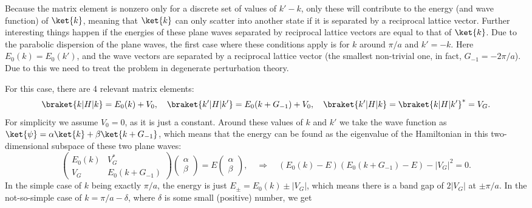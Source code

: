 \documentclass[main.tex]{subfiles}
\begin{document}
	Because the matrix element is nonzero only for a discrete set of values of $ k'-k $, only these will contribute to the energy (and wave function) of $ \ket{k} $, meaning that $ \ket{k} $ can only scatter into another state if it is separated by a reciprocal lattice vector. Further interesting things happen if the energies of these plane waves separated by reciprocal lattice vectors are equal to that of $ \ket{k} $. Due to the parabolic dispersion of the plane waves, the first case where these conditions apply is for $ k $ around $ \pi/a $ and $ k'=-k$. Here $ E_0(k) = E_0(k') $, and the wave vectors are separated by a reciprocal lattice vector (the smallest non-trivial one, in fact, $ G_{-1}=-2\pi/a $). Due to this we need to treat the problem in degenerate perturbation theory.
	
	For this case, there are 4 relevant matrix elements:
	\begin{align}
		\braket{k|H|k} = E_0(k) + V_0, \quad \braket{k'|H|k'} = E_0(k+G_{-1}) + V_0, \quad \braket{k'|H|k} = \braket{k|H|k'}^* = V_G.
	\end{align}
	For simplicity we assume $ V_0 = 0 $, as it is just a constant. Around these values of $ k $ and $ k' $ we take the wave function as $ \ket{\psi} = \alpha \ket{k} + \beta \ket{k+G_{-1}} $, which means that the energy can be found as the eigenvalue of the Hamiltonian in this two-dimensional subspace of these two plane waves:
	\begin{equation}
		\begin{pmatrix}
			E_0(k) & V_G^* \\ V_G & E_0(k+G_{-1})
		\end{pmatrix} \begin{pmatrix}
		\alpha \\ \beta
		\end{pmatrix} = E \begin{pmatrix}
		\alpha \\ \beta
		\end{pmatrix}, \quad \Rightarrow \quad (E_0(k)-E)(E_0(k+G_{-1})-E) - |V_G|^2 = 0.
	\end{equation}
	In the simple case of $ k $ being exactly $ \pi/a $, the energy is just $ E_{\pm} = E_0(k) \pm | V_G| $, which means there is a band gap of $ 2|V_G| $ at $ \pm \pi/a $. In the not-so-simple case of $ k = \pi/a - \delta $, where $ \delta $ is some small (positive) number, we get
	
\end{document}
